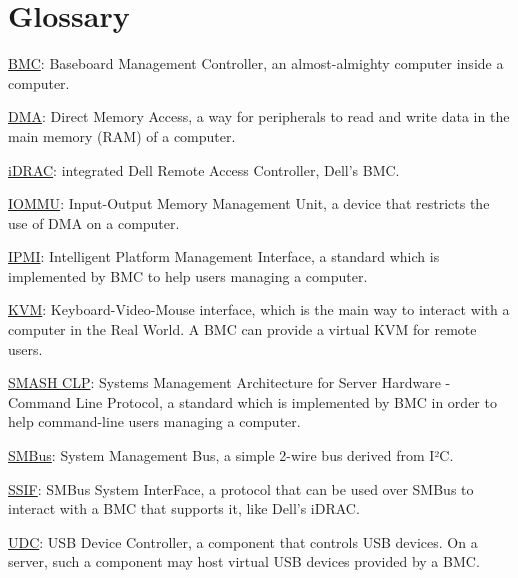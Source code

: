 \section{Glossary}


\noindent
\underline{BMC}: Baseboard Management Controller, an almost-almighty computer inside a computer.

\noindent
\underline{DMA}: Direct Memory Access, a way for peripherals to read and write data in the main memory (RAM) of a computer.

\noindent
\underline{iDRAC}: integrated Dell Remote Access Controller, Dell's BMC.

\noindent
\underline{IOMMU}: Input-Output Memory Management Unit, a device that restricts the use of DMA on a computer.

\noindent
\underline{IPMI}: Intelligent Platform Management Interface, a standard which is implemented by BMC to help users managing a computer.

\noindent
\underline{KVM}: Keyboard-Video-Mouse interface, which is the main way to interact with a computer in the Real World. A BMC can provide a virtual KVM for remote users.

\noindent
\underline{SMASH CLP}: Systems Management Architecture for Server Hardware - Command Line Protocol, a standard which is implemented by BMC in order to help command-line users managing a computer.

\noindent
\underline{SMBus}: System Management Bus, a simple 2-wire bus derived from I²C.

\noindent
\underline{SSIF}: SMBus System InterFace, a protocol that can be used over SMBus to interact with a BMC that supports it, like Dell's iDRAC.

\noindent
\underline{UDC}: USB Device Controller, a component that controls USB devices. On a server, such a component may host virtual USB devices provided by a BMC.



